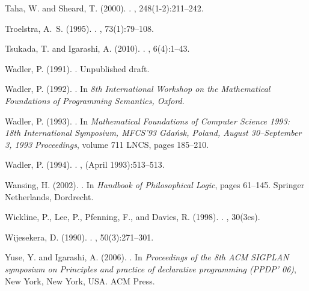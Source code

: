 \documentclass[a4paper]{amsart}
\begin{document}
\begin{thebibliography}{}
Taha, W. and Sheard, T. (2000).
.
, 248(1-2):211--242.

Troelstra, A.~S. (1995).
.
, 73(1):79--108.

Tsukada, T. and Igarashi, A. (2010).
.
, 6(4):1--43.

Wadler, P. (1991).
.
\newblock Unpublished draft.

Wadler, P. (1992).
.
\newblock In {\em 8th International Workshop on the Mathematical Foundations of
  Programming Semantics, Oxford}.

Wadler, P. (1993).
.
\newblock In {\em Mathematical Foundations of Computer Science 1993: 18th
  International Symposium, MFCS'93 Gda{\'{n}}sk, Poland, August 30–September
  3, 1993 Proceedings}, volume 711 LNCS, pages 185--210.

Wadler, P. (1994).
.
, (April 1993):513--513.

Wansing, H. (2002).
.
\newblock In {\em Handbook of Philosophical Logic}, pages 61--145. Springer
  Netherlands, Dordrecht.

Wickline, P., Lee, P., Pfenning, F., and Davies, R. (1998).
.
, 30(3es).

Wijesekera, D. (1990).
.
, 50(3):271--301.

Yuse, Y. and Igarashi, A. (2006).
.
\newblock In {\em Proceedings of the 8th ACM SIGPLAN symposium on Principles
  and practice of declarative programming (PPDP' 06)}, New York, New York, USA.
  ACM Press.

\end{thebibliography}
 
\end{document}
